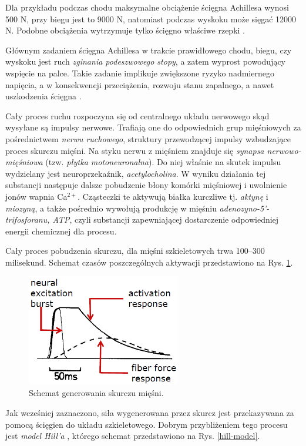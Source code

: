 Dla przykładu podczas chodu maksymalne obciążenie ścięgna Achillesa wynosi 500 N, przy biegu jest to 9000 N, natomiast podczas wyskoku może sięgać 12000 N. Podobne obciążenia wytrzymuje tylko ścięgno właściwe rzepki \cite{Etiologia}.

Głównym zadaniem ścięgna Achillesa w trakcie prawidłowego chodu, biegu, czy wyskoku jest ruch \textit{zginania podeszwowego stopy}, a zatem wyprost powodujący wspięcie na palce. Takie zadanie implikuje zwiększone ryzyko nadmiernego napięcia, a w konsekwencji przeciążenia, rozwoju stanu zapalnego, a nawet uszkodzenia ścięgna \cite{Etiologia}.

Cały proces ruchu rozpoczyna się od centralnego układu nerwowego skąd wysyłane są impulsy nerwowe. Trafiają one do odpowiednich grup mięśniowych za pośrednictwem \textit{nerwu ruchowego}, struktury  przewodzącej impulsy wzbudzające proces skurczu mięśni. Na styku nerwu z mięśniem znajduje się \textit{synapsa nerwowo-mięśniowa} (tzw. \textit{płytka motoneuronalna}). Do niej właśnie na skutek impulsu wydzielany jest neuroprzekaźnik, \textit{acetylocholina}. W wyniku działania tej substancji następuje dalsze pobudzenie błony komórki mięśniowej i uwolnienie jonów wapnia Ca$^{2+}$. Cząsteczki te aktywują białka kurczliwe tj. \textit{aktynę} i \textit{miozyną}, a także pośrednio wywołują produkcję w mięśniu \textit{adenozyno-5'-trifosforanu, ATP}, czyli substancji zapewniającej dostarczenie odpowiedniej energii chemicznej dla procesu.

Cały proces pobudzenia skurczu, dla mięśni szkieletowych trwa 100--300 milisekund. Schemat czasów poszczególnych aktywacji przedstawiono na Rys. \ref{muscle-excitements}. 
\begin{figure}[h!]
	\centering
	\includegraphics[width=0.6\textwidth]{figures/skurcz_miesni.png}
	\caption{Schemat generowania skurczu mięśni.}
	\label{muscle-excitements}
\end{figure}

Jak wcześniej zaznaczono, siła wygenerowana przez skurcz jest przekazywana za pomocą ścięgien do układu szkieletowego. Dobrym przybliżeniem tego procesu jest \textit{model Hill'a} \cite{Hill1938}, którego schemat przedstawiono na Rys. \ref{hill-model}.

